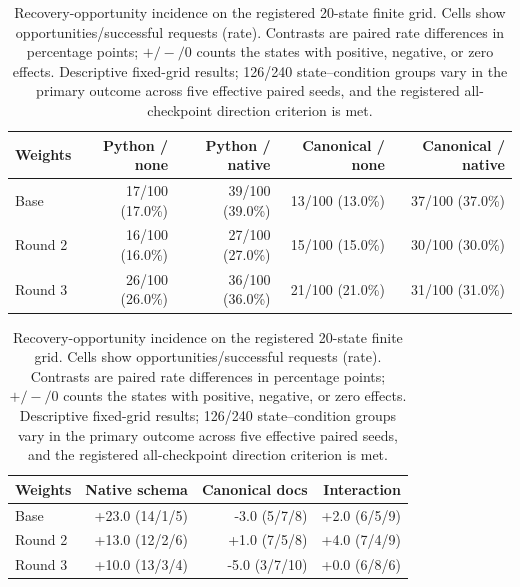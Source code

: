 \begin{table}[t]
\centering
\small
\caption{Recovery-opportunity incidence on the registered 20-state
finite grid. Cells show opportunities/successful requests (rate).
Contrasts are paired rate differences in percentage points; $+/-/0$
counts the states with positive, negative, or zero effects. Descriptive
fixed-grid results; 126/240 state--condition
groups vary in the primary outcome across five effective paired seeds,
and the registered all-checkpoint direction criterion is met.
}
\label{tab:trigger-incidence}
\begin{tabular}{lrrrr}
\toprule
Weights & Python / none & Python / native & Canonical / none & Canonical / native \\
\midrule
Base & 17/100 (17.0\%) & 39/100 (39.0\%) & 13/100 (13.0\%) & 37/100 (37.0\%) \\
Round 2 & 16/100 (16.0\%) & 27/100 (27.0\%) & 15/100 (15.0\%) & 30/100 (30.0\%) \\
Round 3 & 26/100 (26.0\%) & 36/100 (36.0\%) & 21/100 (21.0\%) & 31/100 (31.0\%) \\
\bottomrule
\end{tabular}

\vspace{3pt}
\begin{tabular}{lrrr}
\toprule
Weights & Native schema & Canonical docs & Interaction \\
\midrule
Base & +23.0 (14/1/5) & -3.0 (5/7/8) & +2.0 (6/5/9) \\
Round 2 & +13.0 (12/2/6) & +1.0 (7/5/8) & +4.0 (7/4/9) \\
Round 3 & +10.0 (13/3/4) & -5.0 (3/7/10) & +0.0 (6/8/6) \\
\bottomrule
\end{tabular}
\end{table}
